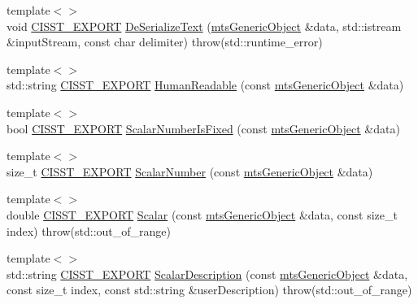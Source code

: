 \begin{DoxyCompactItemize}
\item 
{\footnotesize template$<$$>$ }\\void \hyperlink{cmn_export_macros_8h_a99393e0c3ac434b2605235bbe20684f8}{C\+I\+S\+S\+T\+\_\+\+E\+X\+P\+O\+R\+T} \hyperlink{classcmn_data_a8965ee72ee62e9cf1d666813d764b3ca}{De\+Serialize\+Text} (\hyperlink{classmts_generic_object}{mts\+Generic\+Object} \&data, std\+::istream \&input\+Stream, const char delimiter) throw(std\+::runtime\+\_\+error)
\item 
{\footnotesize template$<$$>$ }\\std\+::string \hyperlink{cmn_export_macros_8h_a99393e0c3ac434b2605235bbe20684f8}{C\+I\+S\+S\+T\+\_\+\+E\+X\+P\+O\+R\+T} \hyperlink{classcmn_data_ad0968cc16b9423331cdb949101ab4bed}{Human\+Readable} (const \hyperlink{classmts_generic_object}{mts\+Generic\+Object} \&data)
\item 
{\footnotesize template$<$$>$ }\\bool \hyperlink{cmn_export_macros_8h_a99393e0c3ac434b2605235bbe20684f8}{C\+I\+S\+S\+T\+\_\+\+E\+X\+P\+O\+R\+T} \hyperlink{classcmn_data_a458e5d0b1d6a2e9c126622865707d703}{Scalar\+Number\+Is\+Fixed} (const \hyperlink{classmts_generic_object}{mts\+Generic\+Object} \&data)
\item 
{\footnotesize template$<$$>$ }\\size\+\_\+t \hyperlink{cmn_export_macros_8h_a99393e0c3ac434b2605235bbe20684f8}{C\+I\+S\+S\+T\+\_\+\+E\+X\+P\+O\+R\+T} \hyperlink{classcmn_data_a4120c9b93519d00e31b3e82e57276c20}{Scalar\+Number} (const \hyperlink{classmts_generic_object}{mts\+Generic\+Object} \&data)
\item 
{\footnotesize template$<$$>$ }\\double \hyperlink{cmn_export_macros_8h_a99393e0c3ac434b2605235bbe20684f8}{C\+I\+S\+S\+T\+\_\+\+E\+X\+P\+O\+R\+T} \hyperlink{classcmn_data_a270de4f6202877444776d8d60c738319}{Scalar} (const \hyperlink{classmts_generic_object}{mts\+Generic\+Object} \&data, const size\+\_\+t index) throw(std\+::out\+\_\+of\+\_\+range)
\item 
{\footnotesize template$<$$>$ }\\std\+::string \hyperlink{cmn_export_macros_8h_a99393e0c3ac434b2605235bbe20684f8}{C\+I\+S\+S\+T\+\_\+\+E\+X\+P\+O\+R\+T} \hyperlink{classcmn_data_ae6c4c0e4076051b08cb2102885208ba6}{Scalar\+Description} (const \hyperlink{classmts_generic_object}{mts\+Generic\+Object} \&data, const size\+\_\+t index, const std\+::string \&user\+Description) throw(std\+::out\+\_\+of\+\_\+range)
\end{DoxyCompactItemize}
